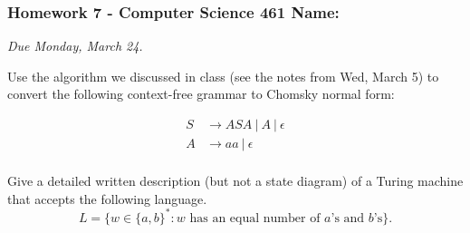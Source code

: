 \documentclass[12pt]{exam}
\begin{document}
\pagestyle{empty}
\subsubsection*{Homework 7 - Computer Science 461 \hfill Name: \underline{\hspace*{2in}}}

\textit{Due Monday, March 24.} %

\begin{questions}

\question Use the algorithm we discussed in class (see the notes from Wed, March 5) to convert the following context-free grammar to Chomsky normal form:

\begin{minipage}{1.5in}
\begin{align*}
S &\rightarrow ASA ~|~ A ~|~ \epsilon \\
A &\rightarrow aa ~|~ \epsilon \\
\end{align*}
\end{minipage}
\vfill


\question Give a detailed written description (but not a state diagram) of a Turing machine that accepts the following language.
$$L = \{ w \in \{a,b\}^* : w \text{ has an equal number of }a\text{'s and }b\text{'s} \}.$$
\vfill


\end{questions}
\end{document}
